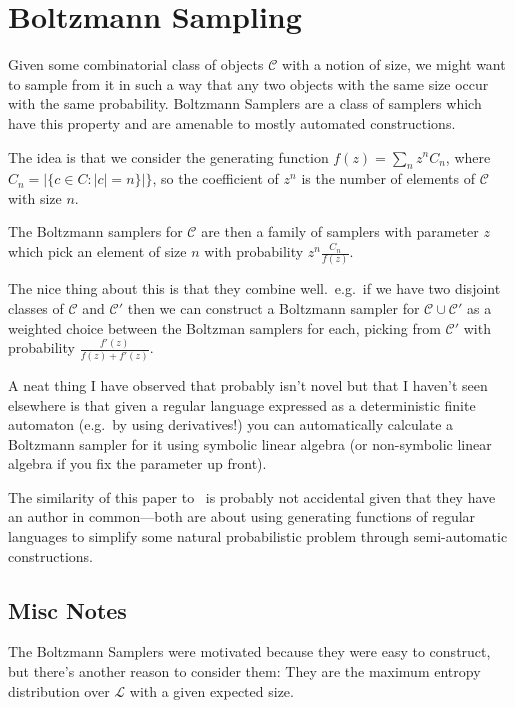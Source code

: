 \chapter{Boltzmann Sampling}

Given some combinatorial class of objects \(\mathcal{C}\) with a notion of size,
we might want to sample from it in such a way that any two objects with the same size occur with the same probability.
Boltzmann Samplers are a class of samplers which have this property and are amenable to mostly automated constructions.

The idea is that we consider the generating function \(f(z) = \sum\limits_n z^n C_n\),
where \(C_n =  |\{c \in C: |c| = n\}|\}\),
so the coefficient of \(z^n\) is the number of elements of \(\mathcal{C}\) with size \(n\).

The Boltzmann samplers for \(\mathcal{C}\) are then a family of samplers with parameter \(z\) which pick an element of size \(n\) with probability \(z^n \frac{C_n}{f(z)}\).

The nice thing about this is that they combine well.\ 
e.g.\ if we have two disjoint classes of \(\mathcal{C}\) and \(\mathcal{C}'\) then we can construct a Boltzmann sampler for \(\mathcal{C} \cup \mathcal{C}'\) as a weighted choice between the Boltzman samplers for each,
picking from \(\mathcal{C}'\) with probability \(\frac{f'(z)}{f(z) + f'(z)}\).

A neat thing I have observed\cite{falbs} that probably isn't novel but that I haven't seen elsewhere is that given a regular language expressed as a deterministic finite automaton
(e.g.\ by using derivatives!)
you can automatically calculate a Boltzmann sampler for it using symbolic linear algebra
(or non-symbolic linear algebra if you fix the parameter up front).

The similarity of this paper to~\cite{DBLP:journals/dam/FlajoletGT92} is probably not accidental given that they have an author in common---both
are about using generating functions of regular languages to simplify some natural probabilistic problem through semi-automatic constructions.

\section{Misc Notes}

The Boltzmann Samplers were motivated because they were easy to construct,
but there's another reason to consider them:
They are the maximum entropy distribution over \(\mathcal{L}\) with a given expected size.


